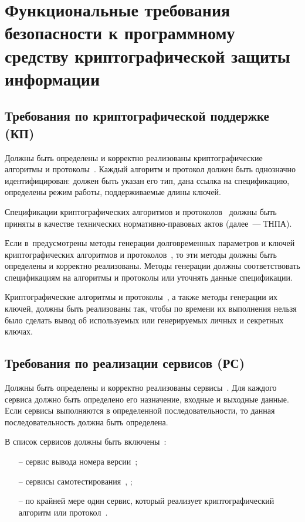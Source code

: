 \chapter{Функциональные требования безопасности к программному средству 
криптографической защиты информации}\label{FReqsTOE}

\section{Требования по криптографической поддержке (КП)}

\label{CryptoAlg}
Должны быть определены и корректно реализованы криптографические алгоритмы 
и протоколы~\TOE. 
%
Каждый алгоритм и протокол должен быть однозначно идентифицирован:
должен быть указан его тип, 
дана ссылка на спецификацию, 
определены режим работы, 
поддерживаемые длины ключей.

\label{CryptoStd}
Спецификации криптографических алгоритмов и протоколов~
должны быть приняты в качестве технических нормативно-правовых актов 
(далее~--- ТНПА).

\label{CryptoGen}
Если в~\TOE предусмотрены методы генерации долговременных параметров и ключей
криптографических алгоритмов и протоколов~, 
то эти методы должны быть определены и корректно реализованы.
%
Методы генерации должны соответствовать спецификациям
на алгоритмы и протоколы или уточнять данные спецификации.

\label{CryptoTiming}
Криптографические алгоритмы и протоколы~,
а также методы генерации их ключей,
должны быть реализованы так,
чтобы по времени их выполнения нельзя было сделать вывод об
используемых или генерируемых личных и секретных ключах.

\section{Требования по реализации сервисов (РС)}

\label{Services}
Должны быть определены и корректно реализованы сервисы~\TOE.
%
Для каждого сервиса должно быть определено его назначение, 
входные и выходные данные. 
%
Если сервисы выполняются в определенной последовательности,
то данная последовательность должна быть определена.

\label{ObligServices}
В список сервисов должны быть включены~:
\begin{itemize}
\item[--]
сервис вывода номера версии~\TOE;
\item[--]
сервисы самотестирования~, ;
\item[--]
по крайней мере один сервис,
который реализует криптографический алгоритм или протокол~.
\end{itemize}


